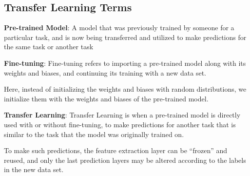 	\subsection{Transfer Learning Terms}
	\begin{bulletedlist}
		\item \textbf{Pre-trained Model}: A model that was previously trained by someone for a particular task, and is
now being transferred and utilized to make predictions for the same task or another task
		\item \textbf{Fine-tuning}: Fine-tuning refers to importing a pre-trained model along with its weights and biases,
and continuing its training with a new data set.
		\begin{bulletedlist}
			\item Here, instead of initializing the weights and biases with random distributions, we initialize them with the weights and biases of the pre-trained model.
		\end{bulletedlist}
		\item \textbf{Transfer Learning}: Transfer Learning is when a pre-trained model is directly used with or without
fine-tuning, to make predictions for another task that is similar to the task that the model was
originally trained on.
		\begin{bulletedlist}
			\item To make such predictions, the feature extraction layer can be ``frozen'' and reused, and only the last prediction layers may be altered according to the labels in the new data set.
		\end{bulletedlist}
	\end{bulletedlist}


